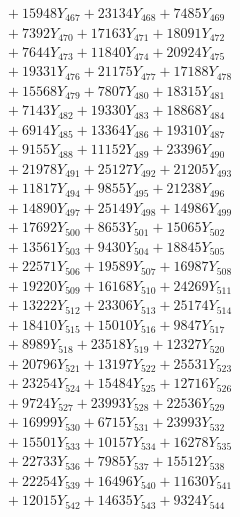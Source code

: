 \documentclass[a4paper,10pt]{article}
\begin{document}
{\begin{align}
&\;  + 15948 Y_{467} + 23134 Y_{468} + 7485 Y_{469} \\[0.3ex]
&\;  + 7392 Y_{470} + 17163 Y_{471} + 18091 Y_{472} \\[0.3ex]
&\;  + 7644 Y_{473} + 11840 Y_{474} + 20924 Y_{475} \\[0.3ex]
&\;  + 19331 Y_{476} + 21175 Y_{477} + 17188 Y_{478} \\[0.5ex]\allowbreak
&\;  + 15568 Y_{479} + 7807 Y_{480} + 18315 Y_{481} \\[0.3ex]
&\;  + 7143 Y_{482} + 19330 Y_{483} + 18868 Y_{484} \\[0.3ex]
&\;  + 6914 Y_{485} + 13364 Y_{486} + 19310 Y_{487} \\[0.3ex]
&\;  + 9155 Y_{488} + 11152 Y_{489} + 23396 Y_{490} \\[0.3ex]
&\;  + 21978 Y_{491} + 25127 Y_{492} + 21205 Y_{493} \\[0.3ex]
&\;  + 11817 Y_{494} + 9855 Y_{495} + 21238 Y_{496} \\[0.3ex]
&\;  + 14890 Y_{497} + 25149 Y_{498} + 14986 Y_{499} \\[0.3ex]
&\;  + 17692 Y_{500} + 8653 Y_{501} + 15065 Y_{502} \\[0.3ex]
&\;  + 13561 Y_{503} + 9430 Y_{504} + 18845 Y_{505} \\[0.3ex]
&\;  + 22571 Y_{506} + 19589 Y_{507} + 16987 Y_{508} \\[0.5ex]\allowbreak
&\;  + 19220 Y_{509} + 16168 Y_{510} + 24269 Y_{511} \\[0.3ex]
&\;  + 13222 Y_{512} + 23306 Y_{513} + 25174 Y_{514} \\[0.3ex]
&\;  + 18410 Y_{515} + 15010 Y_{516} + 9847 Y_{517} \\[0.3ex]
&\;  + 8989 Y_{518} + 23518 Y_{519} + 12327 Y_{520} \\[0.3ex]
&\;  + 20796 Y_{521} + 13197 Y_{522} + 25531 Y_{523} \\[0.3ex]
&\;  + 23254 Y_{524} + 15484 Y_{525} + 12716 Y_{526} \\[0.3ex]
&\;  + 9724 Y_{527} + 23993 Y_{528} + 22536 Y_{529} \\[0.3ex]
&\;  + 16999 Y_{530} + 6715 Y_{531} + 23993 Y_{532} \\[0.3ex]
&\;  + 15501 Y_{533} + 10157 Y_{534} + 16278 Y_{535} \\[0.3ex]
&\;  + 22733 Y_{536} + 7985 Y_{537} + 15512 Y_{538} \\[0.5ex]\allowbreak
&\;  + 22254 Y_{539} + 16496 Y_{540} + 11630 Y_{541} \\[0.3ex]
&\;  + 12015 Y_{542} + 14635 Y_{543} + 9324 Y_{544} \\[0.3ex]

\end{align}}
\end{document}
